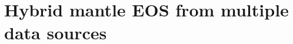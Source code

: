\documentclass[12pt,notitlepage]{article}
\begin{document}
%

\section{Hybrid mantle EOS from multiple data sources}


%

\appendix





%
%
\end{document}
